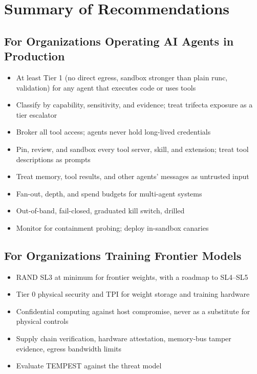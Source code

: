 \documentclass[11pt,letterpaper]{article}
\begin{document}
\section{Summary of Recommendations}
\label{sec:recs}

\subsection{For Organizations Operating AI Agents in Production}

\begin{itemize}
  \item At least Tier 1 (no direct egress, sandbox stronger than plain runc, validation) for any agent that executes code or uses tools
  \item Classify by capability, sensitivity, and evidence; treat trifecta exposure as a tier escalator
  \item Broker all tool access; agents never hold long-lived credentials
  \item Pin, review, and sandbox every tool server, skill, and extension; treat tool descriptions as prompts
  \item Treat memory, tool results, and other agents' messages as untrusted input
  \item Fan-out, depth, and spend budgets for multi-agent systems
  \item Out-of-band, fail-closed, graduated kill switch, drilled
  \item Monitor for containment probing; deploy in-sandbox canaries
\end{itemize}

\subsection{For Organizations Training Frontier Models}

\begin{itemize}
  \item RAND SL3 at minimum for frontier weights, with a roadmap to SL4--SL5
  \item Tier 0 physical security and TPI for weight storage and training hardware
  \item Confidential computing against host compromise, never as a substitute for physical controls
  \item Supply chain verification, hardware attestation, memory-bus tamper evidence, egress bandwidth limits
  \item Evaluate TEMPEST against the threat model
\end{itemize}
\end{document}
